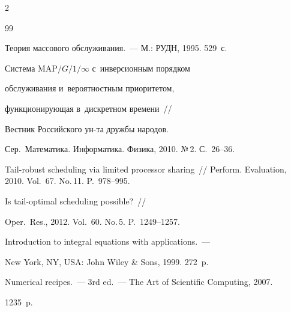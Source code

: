 \begin{multicols}{2}
{{\begin{thebibliography}{99}


Теория массового обслуживания.~--- М.: РУДН, 1995. 529~с.









Система MAP$/G/1/\infty$ с~инверсионным порядком


обслуживания и~вероятностным приоритетом,


функционирующая в~дискретном времени~//


Вестник Российского ун-та дружбы народов.


Сер.\ Математика. Информатика. Физика, 2010. №\,2. С.~26--36.







 Tail-robust scheduling via limited processor sharing~// Perform. Evaluation, 2010. Vol.~67. No.\,11. P.~978--995.







 Is tail-optimal scheduling possible?~//


Oper.\ Res., 2012. Vol.~60. No.\,5. P.~1249--1257.









Introduction to integral equations with applications.~---


New York, NY, USA: John Wiley \& Sons, 1999. 272~p.









Numerical recipes.~--- 3rd ed.~--- The Art of Scientific Computing, 2007.


1235~p.













\end{thebibliography}}}
\end{multicols}
